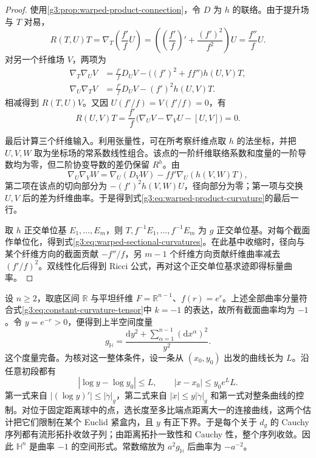 \begin{proof}
	使用\cref{g3:prop:warped-product-connection}，令 \(D\) 为 \(h\) 的联络。由于提升场与 \(T\) 对易，
	\[
		R(T,U)T=\nabla_T\left(\frac{f'}fU\right)
		=\left(\left(\frac{f'}f\right)'+\frac{(f')^2}{f^2}\right)U
		=\frac{f''}fU.
	\]
	对另一个纤维场 \(V\)，两项为
	\[
		\begin{aligned}
		\nabla_T\nabla_UV&=\frac{f'}fD_UV-
		\bigl((f')^2+ff''\bigr)h(U,V)T,\\
		\nabla_U\nabla_TV&=\frac{f'}fD_UV-(f')^2h(U,V)T.
		\end{aligned}
	\]
	相减得到 \(R(T,U)V\)。又因 \(U(f'/f)=V(f'/f)=0\)，有
	\[
		R(U,V)T=\frac{f'}f
		\bigl(\nabla_UV-\nabla_VU-[U,V]\bigr)=0.
	\]

	最后计算三个纤维输入。利用张量性，可在所考察纤维点取 \(h\) 的法坐标，并把 \(U,V,W\) 取为坐标场的常系数线性组合。该点的一阶纤维联络系数和度量的一阶导数均为零，但二阶协变导数的差仍保留 \(R^h\)。由
	\[
		\nabla_U\nabla_VW
		=\nabla_U(D_VW)-ff'\nabla_U(h(V,W)T),
	\]
	第二项在该点的切向部分为 \(-(f')^2h(V,W)U\)，径向部分为零；第一项与交换 \(U,V\) 后的差为纤维曲率。于是得到式\eqref{g3:eq:warped-product-curvature}的最后一行。

	取 \(h\) 正交单位基 \(E_1,\ldots,E_m\)，则 \(T,f^{-1}E_1,\ldots,f^{-1}E_m\) 为 \(g\) 正交单位基。对每个截面作单位化，得到式\eqref{g3:eq:warped-sectional-curvatures}。在此基中收缩时，径向与某个纤维方向的截面贡献 \(-f''/f\)，另 \(m-1\) 个纤维方向贡献纤维曲率减去 \((f'/f)^2\)。双线性化后得到 Ricci 公式，再对这个正交单位基求迹即得标量曲率。
\end{proof}

\begin{example}\label{g3:exm:hyperbolic-warped-halfspace}
	设 \(n\ge2\)，取底区间 \(\mathbb R\) 与平坦纤维 \(F=\mathbb R^{n-1}\)、\(f(r)=e^r\)。上述全部曲率分量符合式\eqref{g3:eq:constant-curvature-tensor}中 \(k=-1\) 的表达，故所有截面曲率均为 \(-1\)。令 \(y=e^{-r}>0\)，便得到上半空间度量
	\[
		g_{\mathbb H}=\frac{\mathrm dy^2+\sum_{\alpha=1}^{n-1}(\mathrm dx^\alpha)^2}{y^2}.
	\]
	这个度量完备。为核对这一整体条件，设一条从 \((x_0,y_0)\) 出发的曲线长为 \(L\)。沿任意初段都有
	\[
		|\log y-\log y_0|\le L,\qquad
		|x-x_0|\le y_0e^L L.
	\]
	第一式来自 \(|(\log y)'|\le|\dot\gamma|_g\)，第二式来自 \(|\dot x|\le y|\dot\gamma|_g\) 和第一式对整条曲线的控制。对位于固定距离球中的点，选长度至多比端点距离大一的连接曲线，这两个估计把它们限制在某个 Euclid 紧盒内，且 \(y\) 有正下界。于是每个关于 \(d_g\) 的 Cauchy 序列都有流形拓扑收敛子列；由距离拓扑一致性和 Cauchy 性，整个序列收敛。因此 \(\mathbb H^n\) 是曲率 \(-1\) 的空间形式。常数缩放为 \(a^2g_{\mathbb H}\) 后曲率为 \(-a^{-2}\)。
\end{example}

